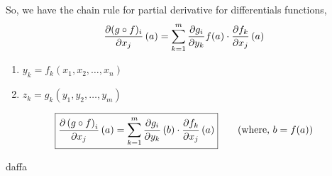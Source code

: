 \documentclass[../Analysis-3.tex]{subfiles}
\begin{document}
So, we have the chain rule for partial derivative for differentials functions,
\[ \pdv{(g\circ f)_{i}}{x_j}\left( a \right) = \sum_{k = 1}^{m} \pdv{g_i}{y_k}f(a)\cdot\pdv{f_k}{x_j}\left( a \right) \]

\begin{notnBox}
  \begin{enumerate}
    \item $y_k = f_k \left( x_1, x_2, \ldots, x_n \right)$
    \item $z_k = g_k \left( y_1, y_2, \ldots, y_m \right)$
  \end{enumerate}
\end{notnBox}

\begin{align*}
  \boxed{
    \pdv{\left( g\circ f \right)_i}{x_j}\left( a \right) = \sum_{k = 1}^{m} \pdv{g_i}{y_k}\left( b \right)\cdot\pdv{f_k}{x_j}\left( a \right)
  } \tag{where, $b = f(a)$}
\end{align*}

daffa
\end{document}
